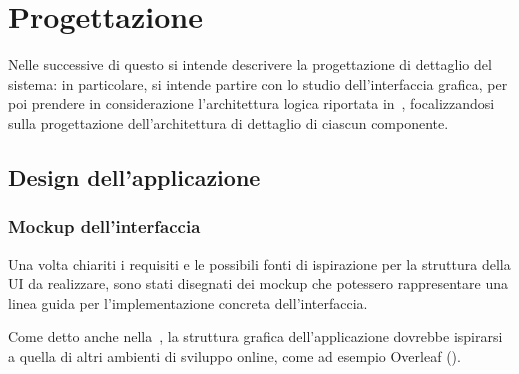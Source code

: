 \chapter{Progettazione}\label{ch:project}




  Nelle  successive di questo  si intende descrivere la progettazione di dettaglio del sistema:
  in particolare, si intende partire con lo studio dell'interfaccia grafica, per poi prendere in considerazione l'architettura logica riportata in~,
  focalizzandosi sulla progettazione dell'architettura di dettaglio di ciascun componente.

  \section{Design dell'applicazione}\label{sec:client-design}

    \subsection{Mockup dell'interfaccia}\label{subsec:mockup}
      Una volta chiariti i requisiti e le possibili fonti di ispirazione per la struttura della UI da realizzare, sono stati disegnati dei mockup che potessero rappresentare una linea guida
      per l'implementazione concreta dell'interfaccia.

      Come detto anche nella~, la struttura grafica dell'applicazione dovrebbe ispirarsi a quella di altri ambienti di sviluppo online,
      come ad esempio Overleaf ().


